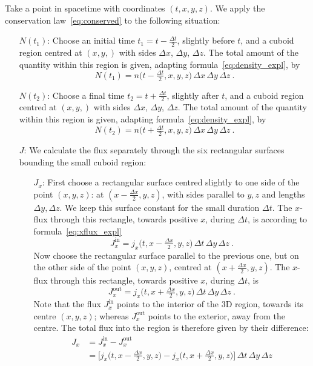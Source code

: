 \documentclass[a4paper,12pt,%
onecolumn,oneside,titlepage,%
british%
]{memoir}
\newcommand*{\incr}{\Delta}%
\renewcommand*{\|}[1][]{\nonscript\:#1\vert\nonscript\:\mathopen{}}
\newcommand*{\yN}{N}
\newcommand*{\yJ}{J}
\newcommand*{\Dt}{\incr t}
\newcommand*{\Dx}{\incr x}
\newcommand*{\Dy}{\incr y}
\newcommand*{\Dz}{\incr z}
\newcommand*{\Dth}{\tfrac{\incr t}{2}}
\newcommand*{\Dxh}{\tfrac{\incr x}{2}}
\begin{document}
Take a point in spacetime with coordinates $(t,x,y,z)$. We apply the conservation law~\eqref{eq:conserved} to the following situation:
\begin{itemize}
\item[$\yN(t_{1})$:] Choose an initial time $t_{1}=t-\Dth$, slightly before $t$, and a cuboid region centred at $(x,y,)$ with sides $\Dx$, $\Dy$, $\Dz$. The total amount of the quantity within this region is given, adapting formula~\eqref{eq:density_expl}, by
  \begin{equation}
    \label{eq:C1dens}
    \yN(t_{1}) = n\bigl(t-\Dth, x,y,z\bigr)\,\Dx\,\Dy\,\Dz \ .
  \end{equation}
  
\item[$\yN(t_{2})$:] Choose a final time $t_{2} = t+\Dth$, slightly after $t$, and a cuboid region centred at $(x,y,)$ with sides $\Dx$, $\Dy$, $\Dz$. The total amount of the quantity within this region is given, adapting formula~\eqref{eq:density_expl}, by
  \begin{equation}
    \label{eq:C2dens}
    \yN(t_{2}) = n\bigl(t+\Dth, x,y,z\bigr)\,\Dx\,\Dy\,\Dz \ .
  \end{equation}
  
\item[$\yJ$:] We calculate the flux separately through the six rectangular surfaces bounding the small cuboid region:
  \begin{itemize}
  \item[$\yJ_{x}$:] First choose a rectangular surface centred slightly to one side of the point $(x,y,z)$: at $(x-\Dxh, y, z)$, with sides parallel to $y,z$ and lengths $\Dy, \Dz$. We keep this surface constant for the small duration $\Dt$. The $x$-flux through this rectangle, towards positive $x$, during $\Dt$, is according to formula~\eqref{eq:xflux_expl}
    \begin{equation*}
      \label{eq:Fxfluxn}
     \yJ_{x}^{\text{in}} = j_{x}\bigl(t, x-\Dxh, y, z\bigr)\,\Dt\,\Dy\,\Dz \ .
    \end{equation*}
    Now choose the rectangular surface parallel to the previous one, but on the other side of the point $(x,y,z)$, centred at $(x+\Dxh, y, z)$. The $x$-flux through this rectangle, towards positive $x$, during $\Dt$, is
    \begin{equation*}
      \label{eq:Fxfluxp}
      \yJ_{x}^{\text{out}} = j_{x}\bigl(t, x+\Dxh, y, z\bigr)\,\Dt\,\Dy\,\Dz \ .
    \end{equation*}
    Note that the flux $\yJ_{x}^{\text{in}}$ points to the interior of the 3D region, towards its centre $(x,y,z)$; whereas $\yJ_{x}^{\text{out}}$ points to the exterior, away from the centre. The total flux into the region is therefore given by their difference:
    \begin{equation}
      \label{eq:Fxflux}
      \begin{split}
        \yJ_{x} &= \yJ_{x}^{\text{in}} - \yJ_{x}^{\text{out}}
        \\&= \bigl[ j_{x}\bigl(t, x-\Dxh, y, z\bigr) - j_{x}\bigl(t, x+\Dxh, y, z\bigr)\bigr]
        \,\Dt\,\Dy\,\Dz
      \end{split}
    \end{equation}
  

\end{itemize}
\end{itemize}
\end{document}
